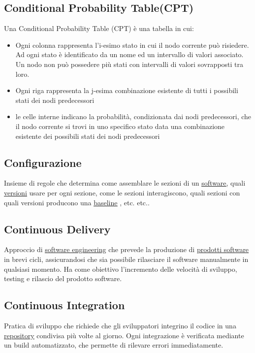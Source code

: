 	\subsection{Conditional Probability Table(CPT)}
	\label{sec:CPT}
	Una Conditional Probability Table (CPT) è una tabella in cui:
		\begin{itemize}
			\item{Ogni colonna rappresenta l'i-esimo stato in cui il nodo corrente può risiedere. Ad ogni stato è identificato da un nome ed un intervallo di valori associato. Un nodo non può possedere più stati con intervalli di valori sovrapposti tra loro.}
			\item{Ogni riga rappresenta la j-esima combinazione esistente di tutti i possibili stati dei nodi predecessori}
			\item{le celle interne indicano la probabilità, condizionata dai nodi predecessori, che il nodo corrente si trovi in uno specifico stato data una combinazione esistente dei possibili stati dei nodi predecessori}
		\end{itemize}
	
	\subsection{Configurazione}
	\label{sec:configurazione}
	Insieme di regole che determina come assemblare le sezioni di un \underline{\hyperref[sec:prodottosoftware]{software}}, quali \underline{\hyperref[sec:versione]{versioni}} usare per ogni sezione, come le sezioni interagiscono, quali sezioni con quali versioni producono una \underline{\hyperref[sec:baseline]{baseline}} , etc. etc..
	
	\subsection{Continuous Delivery}
	\label{sec:continuousdelivery}
	Approccio di \underline{\hyperref[sec:swe]{software engineering}} che prevede la produzione di \underline{\hyperref[sec:prodottosoftware]{prodotti software}} in brevi cicli, assicurandosi che sia possibile rilasciare il software manualmente in qualsiasi momento. Ha come obiettivo l'incremento delle velocità di sviluppo, testing e rilascio del prodotto software.
	
	\subsection{Continuous Integration}
	\label{sec:continuousintegration}
	Pratica di sviluppo che richiede che gli sviluppatori integrino il codice in una \underline{\hyperref[sec:repo]{repository}} condivisa più volte al giorno. Ogni integrazione è verificata mediante un build automatizzato, che permette di rilevare errori immediatamente.
	
